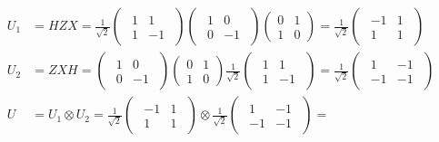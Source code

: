 \documentclass{article}
\begin{document}
\begin{align}
  U_1 &= HZX=\frac{1}{\sqrt{2}}\begin{pmatrix}\begin{array}{rr} 1 & 1 \\ 1 & -1
  \end{array} \end{pmatrix}\begin{pmatrix} \begin{array}{rr}1 & 0 \\ 0 & -1
  \end{array}\end{pmatrix}\begin{pmatrix} 0 & 1 \\ 1 & 0
  \end{pmatrix}=\frac{1}{\sqrt{2}}
  \begin{pmatrix}\begin{array}{rr} -1 & 1 \\ 1 & 1 \end{array}\end{pmatrix}
  \\
  U_2 &= ZXH = \begin{pmatrix}\begin{array}{rr} 1 & 0 \\ 0 & -1
  \end{array}\end{pmatrix}\begin{pmatrix} 0 & 1 \\ 1 & 0
  \end{pmatrix}\frac{1}{\sqrt{2}} \begin{pmatrix}\begin{array}{rr} 1 & 1 \\ 1 &
  -1 \end{array} \end{pmatrix} = \frac{1}{\sqrt{2}}
  \begin{pmatrix}\begin{array}{rr} 1 & -1 \\ -1 & -1 \end{array}\end{pmatrix}
  \\
  U &= U_1 \otimes U_2 = \frac{1}{\sqrt{2}} \begin{pmatrix}\begin{array}{rr} -1 &
  1 \\ 1 & 1 \end{array} \end{pmatrix} \otimes \frac{1}{\sqrt{2}}
  \begin{pmatrix}\begin{array}{rr} 1 & -1 \\ -1 & -1 \end{array} \end{pmatrix} =

\end{align}
\end{document}

